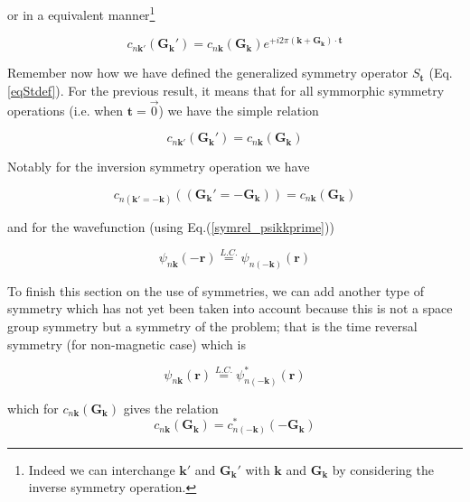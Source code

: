 \documentclass[a4paper,12pt]{report}
\begin{document}
or in a equivalent manner\footnote{Indeed we can interchange $\mathbf{k}'$ and $\mathbf{G}_{\mathbf{k}}'$ with $\mathbf{k}$ and $\mathbf{G}_{\mathbf{k}}$ by considering the inverse symmetry operation.}

\begin{equation}
c_{n\mathbf{k}'}(\mathbf{G}_{\mathbf{k}}') = c_{n\mathbf{k}}(\mathbf{G}_{\mathbf{k}}) e^{+i2\pi \left( \mathbf{k} + \mathbf{G}_{\mathbf{k}}\right)\cdotp \mathbf{t}} \label{cnkG_cnk'G'_rel}
\end{equation}

Remember now how we have defined the generalized symmetry operator $S_{\mathbf{t}}$ (Eq.\ref{eqStdef}). For the previous result, it means that for all symmorphic symmetry operations (i.e. when $\mathbf{t}=\overrightarrow{0}$) we have the simple relation

\begin{equation}
c_{n\mathbf{k}'}(\mathbf{G}_{\mathbf{k}}') = c_{n\mathbf{k}}(\mathbf{G}_{\mathbf{k}})
\end{equation}

Notably for the inversion symmetry operation we have

\begin{equation}
c_{n(\mathbf{k}'=-\mathbf{k})}((\mathbf{G}_{\mathbf{k}}'=-\mathbf{G}_{\mathbf{k}})) = c_{n\mathbf{k}}(\mathbf{G}_{\mathbf{k}})
\end{equation}

and for the wavefunction (using Eq.(\ref{symrel_psikkprime}))

\begin{equation}
\psi_{n\mathbf{k}}(-\mathbf{r}) \stackrel{L.C.}{=} \psi_{n(-\mathbf{k})}(\mathbf{r})
\end{equation}

To finish this section on the use of symmetries, we can add another type of symmetry which has not yet been taken into account because this is not a space group symmetry but a symmetry of the problem; that is the time reversal symmetry (for non-magnetic case) which is

\begin{equation}
\psi_{n\mathbf{k}}(\mathbf{r}) \stackrel{L.C.}{=} \psi_{n(-\mathbf{k})}^{*}(\mathbf{r})
\end{equation}

which for $c_{n\mathbf{k}}(\mathbf{G}_{\mathbf{k}})$ gives the relation
\begin{equation}
c_{n\mathbf{k}}(\mathbf{G}_{\mathbf{k}}) = c_{n(-\mathbf{k})}^{*}(-\mathbf{G}_{\mathbf{k}})
\end{equation}
\end{document}
